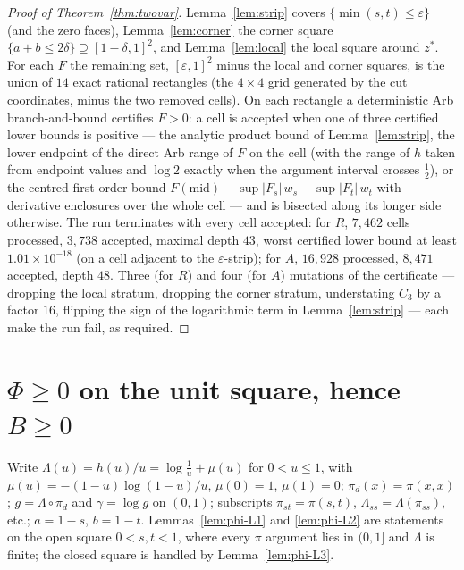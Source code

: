 \documentclass[11pt]{article}
\theoremstyle{plain}
\theoremstyle{definition}
\theoremstyle{remark}
\newcommand{\Lam}{\Lambda}
\begin{document}
\begin{proof}[Proof of Theorem~\ref{thm:twovar}]
Lemma~\ref{lem:strip} covers $\{\min(s,t)\le\varepsilon\}$ (and the zero
faces), Lemma~\ref{lem:corner} the corner square $\{a+b\le2\delta\}\supseteq
[1-\delta,1]^2$, and Lemma~\ref{lem:local} the local square around
$z^\ast$.  For each $F$ the remaining set, $[\varepsilon,1]^2$ minus the local
and corner squares, is the union of $14$ exact rational rectangles (the
$4\times4$ grid generated by the cut coordinates, minus the two removed
cells).  On each rectangle a deterministic Arb branch-and-bound certifies
$F>0$: a cell is accepted when one of three certified lower bounds is
positive --- the analytic product bound of Lemma~\ref{lem:strip}, the lower
endpoint of the direct Arb range of $F$ on the cell (with the range of $h$
taken from endpoint values and $\log2$ exactly when the argument interval
crosses $\tfrac12$), or the centred first-order bound
$F(\mathrm{mid})-\sup|F_s|\,w_s-\sup|F_t|\,w_t$ with derivative enclosures over
the whole cell --- and is bisected along its longer side otherwise.  The run
terminates with every cell accepted: for $R$, $7{,}462$ cells processed,
$3{,}738$ accepted, maximal depth $43$, worst certified lower bound at least
$1.01\times10^{-18}$ (on a cell adjacent to the $\varepsilon$-strip); for $A$,
$16{,}928$ processed, $8{,}471$ accepted, depth $48$.  Three (for $R$) and four
(for $A$) mutations of the certificate --- dropping the local stratum,
dropping the corner stratum, understating $C_3$ by a factor $16$, flipping the
sign of the logarithmic term in Lemma~\ref{lem:strip} --- each make the run
fail, as required.
\end{proof}

\section{\texorpdfstring{$\Phi\ge0$}{Phi>=0} on the unit square, hence \texorpdfstring{$B\ge0$}{B>=0}}\label{sec:phi}

Write $\Lam(u)=h(u)/u=\log\tfrac1u+\mu(u)$ for $0<u\le1$, with
$\mu(u)=-(1-u)\log(1-u)/u$, $\mu(0)=1$, $\mu(1)=0$; $\pi_d(x)=\pi(x,x)$;
$g=\Lam\circ\pi_d$ and $\gamma=\log g$ on $(0,1)$; subscripts
$\pi_{st}=\pi(s,t)$, $\Lam_{ss}=\Lam(\pi_{ss})$, etc.; $a=1-s$, $b=1-t$.
Lemmas~\ref{lem:phi-L1} and \ref{lem:phi-L2} are statements on the open
square $0<s,t<1$, where every $\pi$ argument lies in $(0,1]$ and $\Lam$ is
finite; the closed square is handled by Lemma~\ref{lem:phi-L3}.
\end{document}
